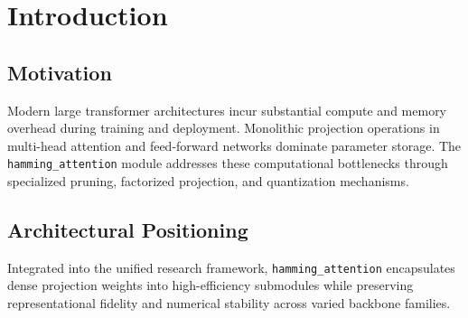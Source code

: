 \section{Introduction}

\subsection{Motivation}
Modern large transformer architectures incur substantial compute and memory overhead during training and deployment. Monolithic projection operations in multi-head attention and feed-forward networks dominate parameter storage. The \texttt{hamming_attention} module addresses these computational bottlenecks through specialized pruning, factorized projection, and quantization mechanisms.

\subsection{Architectural Positioning}
Integrated into the unified research framework, \texttt{hamming_attention} encapsulates dense projection weights into high-efficiency submodules while preserving representational fidelity and numerical stability across varied backbone families.
